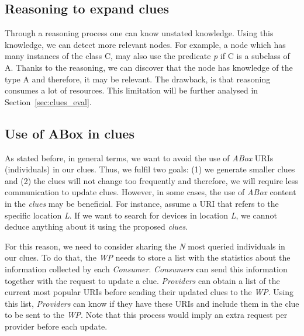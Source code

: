 \subsection{Reasoning to expand clues} %
Through a reasoning process one can know unstated knowledge.
Using this knowledge, we can detect more relevant nodes.
For example, a node which has many instances of the class C, may also use the predicate \emph{p} if C is a subclass of A.
Thanks to the reasoning, we can discover that the node has knowledge of the type A and therefore, it may be relevant.
The drawback, is that reasoning consumes a lot of resources.
This limitation will be further analysed in Section~\ref{sec:clues_eval}.


\subsection{Use of ABox in clues}
\label{sec:aboxinclues}
As stated before, in general terms, we want to avoid the use of \emph{ABox} URIs (individuals) in our clues.
Thus, we fulfil two goals:
(1) we generate smaller clues and
(2) the clues will not change too frequently and therefore, we will require less communication to update clues.
However, in some cases, the use of \emph{ABox} content in the \emph{clues} may be beneficial.
For instance, assume a URI that refers to the specific location \emph{L}.
If we want to search for devices in location \emph{L}, we cannot deduce anything about it using the proposed \emph{clues}.

For this reason, we need to consider sharing the \emph{N} most queried individuals in our clues.
To do that, the \emph{WP} needs to store a list with the statistics about the information collected by each \emph{Consumer}.
\emph{Consumers} can send this information together with the request to update a clue.
\emph{Providers} can obtain a list of the current most popular URIs before sending their updated clues to the \emph{WP}.
Using this list, \emph{Providers} can know if they have these URIs and include them in the clue to be sent to the \emph{WP}.
Note that this process would imply an extra request per provider before each update.

